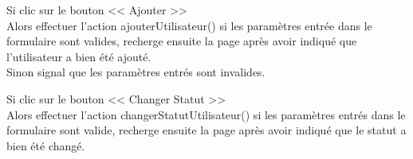 \begin{paragraphe}
			\begin{paragraphe}
				La page a été découpée en deux :
			\end{paragraphe}

			\begin{paragraphe}
				Si clic sur le bouton << Ajouter >> \\
				Alors effectuer l'action ajouterUtilisateur() si les paramètres entrée dans le formulaire sont valides, recherge ensuite la page après avoir indiqué que l'utilisateur a bien été ajouté. \\
				Sinon signal que les paramètres entrés sont invalides.
			\end{paragraphe}

			\begin{paragraphe}
				Si clic sur le bouton << Changer Statut >> \\
				Alors effectuer l'action changerStatutUtilisateur() si les paramètres entrés dans le formulaire sont valide, recherge ensuite la page après avoir indiqué que le statut a bien été changé.
			\end{paragraphe}
